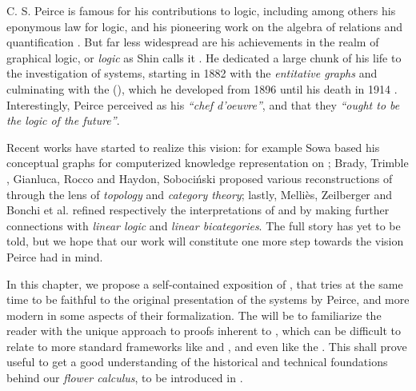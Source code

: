 \begin{scope}


C. S. Peirce is famous for his contributions to  logic, including
among others his eponymous law for  logic, and his pioneering work
on the algebra of relations and quantification .
But far less widespread are his achievements in the realm of graphical logic, or
\emph{ logic} as Shin calls it
. He dedicated a large chunk of his
life to the investigation of  systems, starting in 1882 with
the \emph{entitative graphs} and culminating with the 
(), which he developed from 1896 until his death in 1914
. Interestingly, Peirce perceived 
as his \textit{``chef d'oeuvre''}, and that they \textit{``ought to be the logic
of the future''}.

Recent works have started to realize this vision: for example Sowa based his
conceptual graphs for computerized knowledge representation on 
; Brady, Trimble
, Gianluca, Rocco
 and Haydon, Sobociński
 proposed various reconstructions of
 through the lens of \emph{topology} and \emph{category theory}; lastly,
Melliès, Zeilberger  and Bonchi et al.
 refined respectively the interpretations of
\cite{brady_string_nodate} and \cite{pietarinen_compositional_2020} by making
further connections with \emph{linear logic}  and
\emph{linear bicategories}. The full story has yet to be told, but we hope that
our work will constitute one more step towards the vision Peirce had in mind.

In this chapter, we propose a self-contained exposition of , that tries
at the same time to be faithful to the original presentation of the systems by
Peirce, and more modern in some aspects of their formalization. The 
will be to familiarize the reader with the unique approach to proofs inherent to
, which can be difficult to relate to more standard frameworks like
 and  , and even   like the . This shall prove useful to get a good understanding of the
historical and technical foundations behind our \emph{flower calculus}, to be
introduced in .


\end{scope}
